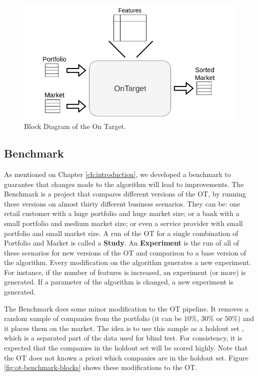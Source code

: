 \begin{figure}[h]
   \centering
   \includegraphics[width=\linewidth]{fig/ch3-ot-blocks.png}
   \caption{Block Diagram of the On Target.}
   \label{fig:ot-blocks}
\end{figure}

\subsection{Benchmark}

As mentioned on Chapter \ref{ch:introduction}, we developed a benchmark to guarantee that changes made to the algorithm will lead to improvements. The Benchmark is a project that compares different versions of the OT, by running these versions on almost thirty different business scenarios. They can be: one retail customer with a huge portfolio and huge market size; or a bank with a small portfolio and medium market size; or even a service provider with small portfolio and small market size. A run of the OT for a single combination of Portfolio and Market is called a \textbf{Study}. An \textbf{Experiment} is the run of all of these scenarios for new versions of the OT and comparison to a base version of the algorithm. Every modification on the algorithm generates a new experiment. For instance, if the number of features is increased, an experiment (or more) is generated. If a parameter of the algorithm is changed, a new experiment is generated.

The Benchmark does some minor modification to the OT pipeline. It removes a random sample of companies from the portfolio (it can be $10\%$, $30\%$ or $50\%$) and it places them on the market. The idea is to use this sample as a holdout set \cite{kohavi2001}, which is a separated part of the data used for blind test. For consistency, it is expected that the companies in the holdout set will be scored highly. Note that the OT does not known a priori which companies are in the holdout set. Figure \ref{fig:ot-benchmark-blocks} shows these modifications to the OT.


